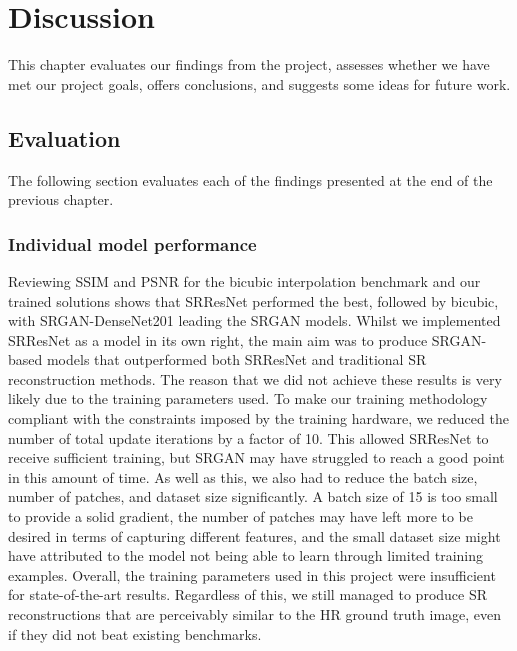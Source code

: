 \chapter{Discussion}\label{chapter4}
This chapter evaluates our findings from the project, assesses whether we have met our project goals, offers conclusions, and suggests some ideas for future work.

\section{Evaluation}
The following section evaluates each of the findings presented at the end of the previous chapter.

\subsection{Individual model performance}
Reviewing SSIM and PSNR for the bicubic interpolation benchmark and our trained solutions shows that SRResNet performed the best, followed by bicubic, with SRGAN-DenseNet201 leading the SRGAN models. Whilst we implemented SRResNet as a model in its own right, the main aim was to produce SRGAN-based models that outperformed both SRResNet and traditional SR reconstruction methods. The reason that we did not achieve these results is very likely due to the training parameters used. To make our training methodology compliant with the constraints imposed by the training hardware, we reduced the number of total update iterations by a factor of 10. This allowed SRResNet to receive sufficient training, but SRGAN may have struggled to reach a good point in this amount of time. As well as this, we also had to reduce the batch size, number of patches, and dataset size significantly. A batch size of 15 is too small to provide a solid gradient, the number of patches may have left more to be desired in terms of capturing different features, and the small dataset size might have attributed to the model not being able to learn through limited training examples. Overall, the training parameters used in this project were insufficient for state-of-the-art results. Regardless of this, we still managed to produce SR reconstructions that are perceivably similar to the HR ground truth image, even if they did not beat existing benchmarks.

